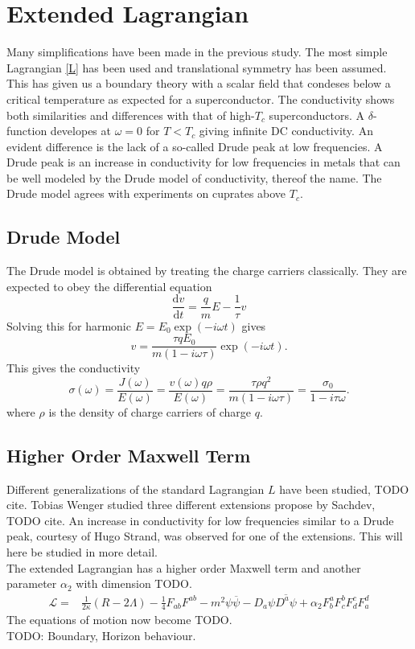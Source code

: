 \documentclass[12pt]{report}
\renewcommand{\d}{\ensuremath{\mathrm{d}}}
\renewcommand{\i}{\ensuremath{i}}
\begin{document}
\chapter{Extended Lagrangian\label{higherOrder}}
Many simplifications have been made in the previous study. The most simple Lagrangian \eqref{L} has been used and translational symmetry has been assumed. This has given us a boundary theory with a scalar field that condeses below a critical temperature as expected for a superconductor. The conductivity shows both similarities and differences with that of high-$T_c$ superconductors. A $\delta$-function developes at $\omega=0$ for $T<T_c$ giving infinite DC conductivity. An evident difference is the lack of a so-called Drude peak at low frequencies. A Drude peak is an increase in conductivity for low frequencies in metals that can be well modeled by the Drude model of conductivity\cite{drude}, thereof the name. The Drude model agrees with experiments on cuprates above $T_c$\cite{drudeFit}.

\section{Drude Model}
The Drude model is obtained by treating the charge carriers classically. They are expected to obey the differential equation
\begin{equation}
 \frac{\d v}{\d t}=\frac{q}{m}E-\frac{1}{\tau}v
\end{equation}
Solving this for harmonic $E=E_0\exp(-\i\omega t)$ gives 
\begin{equation}
 v=\frac{\tau qE_0}{m(1-\i\omega\tau)}\exp(-\i\omega t).
\end{equation}
This gives the conductivity
\begin{equation}
 \sigma(\omega)=\frac{J(\omega)}{E(\omega)}=\frac{v(\omega)q\rho}{E(\omega)}=\frac{\tau\rho q^2}{m(1-\i\omega\tau)}=\frac{\sigma_0}{1-\i\tau\omega}.
\end{equation}
where $\rho$ is the density of charge carriers of charge $q$.


\section{Higher Order Maxwell Term}
Different generalizations of the standard Lagrangian $L$ have been studied, TODO cite. Tobias Wenger studied three different extensions propose by Sachdev, TODO cite. An increase in conductivity for low frequencies similar to a Drude peak, courtesy of Hugo Strand, was observed for one of the extensions. This will here be studied in more detail.\\
The extended Lagrangian has a higher order Maxwell term and another parameter $\alpha_2$ with dimension TODO.
\begin{eqnarray}
 \mathcal{L}=&\frac{1}{2\kappa}\left(R-2\Lambda\right)-\frac{1}{4}F_{ab}F^{ab}-m^2\psi\overline{\psi}-D_a\psi\overline{D^a\psi}
+\alpha_2F^a_bF^b_cF^c_dF^d_a\label{L2}
\end{eqnarray}
The equations of motion now become TODO.\\
TODO: Boundary, Horizon behaviour.\\
\end{document}
